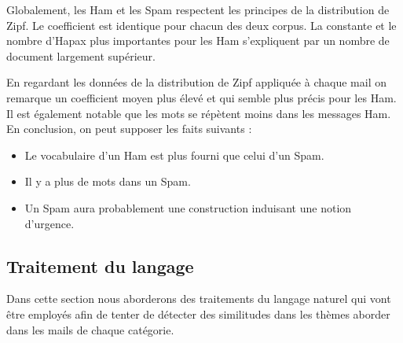 \documentclass[a4paper,12pt]{article}
\begin{document}
			Globalement, les Ham et les Spam respectent les principes de la distribution de Zipf. Le coefficient est identique pour chacun des deux corpus. La constante et le nombre d'Hapax plus importantes pour les Ham s'expliquent par un nombre de document largement supérieur.
			 
			En regardant les données de la distribution de Zipf appliquée à chaque mail on remarque un coefficient moyen plus élevé et qui semble plus précis pour les Ham. Il est également notable que les mots se répètent moins dans les messages Ham.\\
			
			
			En conclusion, on peut supposer les faits suivants : 
			\begin{itemize}
				\item Le vocabulaire d'un Ham est plus fourni que celui d'un Spam.
				\item Il y a plus de mots dans un Spam.
				\item Un Spam aura probablement une construction induisant une notion d'urgence.
			\end{itemize}
			
		
	\subsection{Traitement du langage}
		 Dans cette section nous aborderons des traitements du langage naturel qui vont être employés afin de tenter de détecter des similitudes dans les thèmes aborder dans les mails de chaque catégorie. 
		 
	
\end{document}

